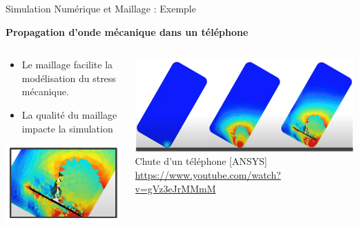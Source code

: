 \begin{frame}{Simulation Numérique et Maillage : Exemple}
    \begin{block}{}
        \textbf{Propagation d'onde mécanique dans un téléphone}
    \end{block}
    
    \begin{columns}
        \begin{column}{0.4\textwidth}
            \begin{itemize}
                \item Le maillage facilite la modélisation du stress mécanique.
                \item La qualité du maillage impacte la simulation 
            \end{itemize}
            \begin{center}
                \includegraphics[width=.9\linewidth]{img/new_images/convergence_depend_simu.PNG}
            \end{center}
        \end{column}
        \begin{column}{0.6\textwidth}
            \includegraphics[width=\linewidth]{img/new_images/phone_drop.png}
            Chute d'un téléphone [ANSYS]\\
            \scriptsize{\url{https://www.youtube.com/watch?v=gVz3eJrMMmM}}
        \end{column}
    \end{columns}
\end{frame}


